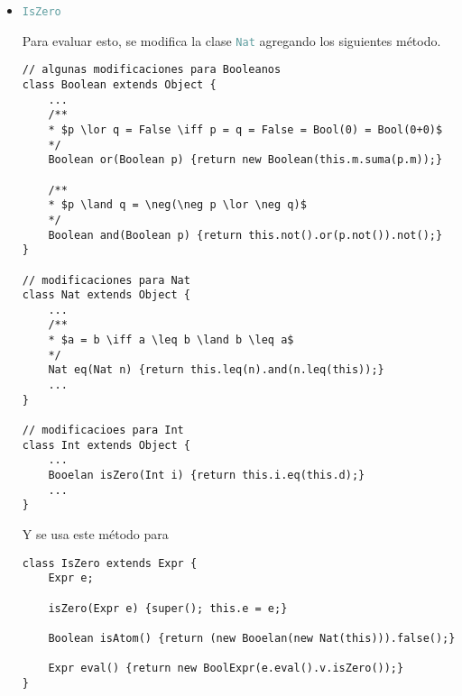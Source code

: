 \documentclass{article}
\newcommand{\tp}[1]{\textcolor{CadetBlue} {\texttt{#1}}}
\begin{document}
\begin{enumerate}
\begin{enumerate}
\begin{itemize}
\begin{verbatim}
    NumExpr(Int v) {super(); this.v = v;}
    ...
}
                \end{verbatim}

                Y con estas nuevas modificaciones se define \tp{NegExpr}
                \begin{verbatim}
// manejar expresiones con negativos
class NegExpr extends Expr {
    Expr e;

    NegExpr(Expr e) {this.e = e;}

    Boolean isAtom() {return (new Booelan(new Nat(this))).false();}

    Expr eval() {return this.e.eval().neg();}
}
                \end{verbatim}
                \item \tp{IsZero}

                Para evaluar esto, se modifica la clase \tp{Nat} agregando los
                siguientes método.

                \begin{verbatim}
// algunas modificaciones para Booleanos
class Boolean extends Object {
    ...
    /**
    * $p \lor q = False \iff p = q = False = Bool(0) = Bool(0+0)$
    */
    Boolean or(Boolean p) {return new Boolean(this.m.suma(p.m));}

    /**
    * $p \land q = \neg(\neg p \lor \neg q)$
    */
    Boolean and(Boolean p) {return this.not().or(p.not()).not();}
}

// modificaciones para Nat
class Nat extends Object {
    ...
    /**
    * $a = b \iff a \leq b \land b \leq a$
    */
    Nat eq(Nat n) {return this.leq(n).and(n.leq(this));}
    ...
}

// modificacioes para Int
class Int extends Object {
    ...
    Booelan isZero(Int i) {return this.i.eq(this.d);}
    ...
}
                \end{verbatim}

                Y se usa este método para

                \begin{verbatim}
class IsZero extends Expr {
    Expr e;

    isZero(Expr e) {super(); this.e = e;}

    Boolean isAtom() {return (new Booelan(new Nat(this))).false();}

    Expr eval() {return new BoolExpr(e.eval().v.isZero());}
}
                \end{verbatim}
            \end{itemize}


\end{enumerate}
\end{enumerate}
\end{document}
